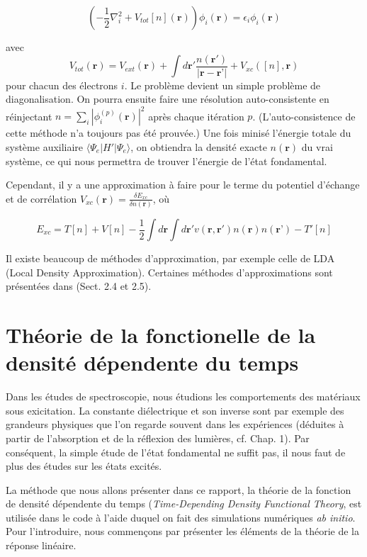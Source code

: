 \documentclass[12pt]{report}
\theoremstyle{theoreme}
\begin{document}
$$
(-\frac{1}{2}\nabla_i^2 + V_{tot}[n](\textbf{r}))\phi_i(\textbf{r}) = \epsilon_i \phi_i (\textbf{r})
$$

avec 
$$
V_{tot}(\textbf{r}) = V_{ext}(\textbf{r}) + \int d\textbf{r}' \frac{n(\textbf{r}')}{|\textbf{r} - \textbf{r'}|} + V_{xc}([n], \textbf{r})
$$
pour chacun des électrons $i$. Le problème devient un simple problème de diagonalisation. On pourra ensuite faire une résolution auto-consistente en réinjectant $n = \sum_i |\phi_i^{(p)}(\textbf{r})|^2 $ après chaque itération $p$. (L'auto-consistence de cette méthode n'a toujours pas été prouvée.) Une fois minisé l'énergie totale du système auxiliaire $\langle \Psi_e | H' | \Psi_e \rangle $, on obtiendra la densité exacte $n(\textbf{r})$ du vrai système, ce qui nous permettra de trouver l'énergie de l'état fondamental.

Cependant, il y a une approximation à faire pour le terme du potentiel d'échange et de corrélation $V_{xc}(\textbf{r}) = \frac{\delta E_{xc}}{\delta n(\textbf{r})}$, où 

$$
E_{xc} = T[n] + V[n] - \frac{1}{2}\int d\textbf{r} \int d\textbf{r}' v(\textbf{r}, \textbf{r}') n(\textbf{r}) n(\textbf{r'}) - T'[n]
$$

Il existe beaucoup de méthodes d'approximation, par exemple celle de LDA (Local Density Approximation). Certaines méthodes d'approximations sont présentées dans \cite{Sot03} (Sect. 2.4 et 2.5).

\section{Théorie de la fonctionelle de la densité dépendente du temps} \label{TDDFT}
Dans les études de spectroscopie, nous étudions les comportements des matériaux sous exicitation. La constante diélectrique et son inverse sont par exemple des grandeurs physiques que l'on regarde souvent dans les expériences (déduites à partir de l'absorption et de la réflexion des lumières, cf. \cite{Sot03} Chap. 1). Par conséquent, la simple étude de l'état fondamental ne suffit pas, il nous faut de plus des études sur les états excités. 

La méthode que nous allons présenter dans ce rapport, la théorie de la fonction de densité dépendente du temps (\textit{Time-Depending Density Functional Theory}, est utilisée dans le code à l'aide duquel on fait des simulations numériques \textit{ab initio}. Pour l'introduire, nous commençons par présenter les éléments de la théorie de la réponse linéaire.
\end{document}
